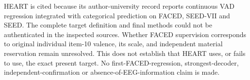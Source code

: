\documentclass[10pt,a4paper]{article}
\begin{document}
HEART is cited because its author-university record reports continuous VAD regression integrated with categorical prediction on FACED, SEED-VII and SEED. The complete target definition and final methods could not be authenticated in the inspected sources. Whether FACED supervision corresponds to original individual item-10 valence, its scale, and independent material reservation remain unresolved. This does not establish that HEART uses, or fails to use, the exact present target. No first-FACED-regression, strongest-decoder, independent-confirmation or absence-of-EEG-information claim is made.

\clearpage





\end{document}
